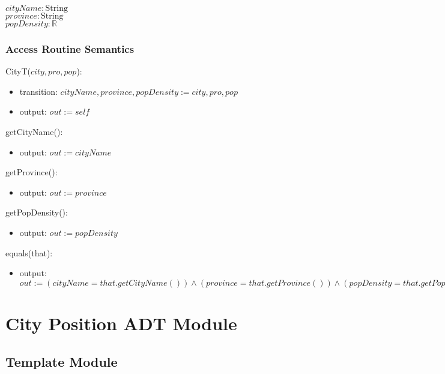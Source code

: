 \documentclass[12pt]{article}
\begin{document}
$\mathit{cityName}: \text{String}$\\
$\mathit{province}: \text{String}$\\
$\mathit{popDensity}: \mathbb{R}$\\


\subsubsection* {Access Routine Semantics}

CityT($city, pro, pop$):
\begin{itemize}
\item transition: $cityName, province, popDensity := city, pro, pop$ 

\item output: $\mathit{out} := \mathit{self}$
\end{itemize}


\noindent getCityName():
\begin{itemize}
\item output: $\mathit{out} := cityName$ 
\end{itemize}

\noindent getProvince():
\begin{itemize}
\item output: $\mathit{out} := province$
\end{itemize}

\noindent getPopDensity():
\begin{itemize}
\item output: $\mathit{out} := popDensity$
\end{itemize}


\noindent equals(that):
\begin{itemize}
\item output: $\mathit{out} := (cityName = that.getCityName()) \land (province = that.getProvince()) \land (popDensity = that.getPopDensity())$
\end{itemize}





\newpage

\section* {City Position ADT Module}

\subsection* {Template Module}
\end{document}
